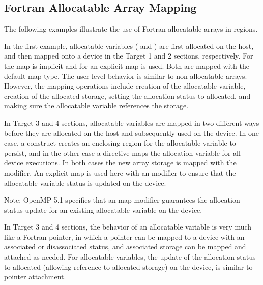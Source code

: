 \begin{fortranspecific}[4ex]
\section{Fortran Allocatable Array Mapping}
\label{sec:fort_allocatable_array_mapping}


The following examples illustrate the use of Fortran allocatable arrays in  regions.

In the first example, allocatable variables ( and ) are first allocated
on the host, and then mapped onto a device in the Target 1 and 2 sections, respectively.
For  the map is implicit and for  an explicit map is used.
Both are mapped with the default  map type.
The user-level behavior is similar to non-allocatable arrays.
However, the mapping operations include creation of the allocatable variable,
creation of the allocated storage, setting the allocation status to allocated,
and making sure the allocatable variable references the storage.

In Target 3 and 4 sections, allocatable variables are mapped in two
different ways before they are allocated on the host and subsequently used on the device.
In one case, a  construct creates an enclosing region for
the allocatable variable to persist, and in the other case a
 directive maps the allocation variable for all device executions.
In both cases the new array storage is mapped  with the  modifier.
An explicit map is used here with an  modifier to ensure that the allocatable
variable status is updated on the device.

Note: OpenMP 5.1 specifies that an  map modifier guarantees the
allocation status update for an existing allocatable variable on the device.

In Target 3 and 4 sections, the behavior of an allocatable variable is very
much like a Fortran pointer, in which a pointer can be mapped to a device with an associated
or disassociated status, and associated storage can be mapped and attached as needed.
For allocatable variables, the update of the allocation status to allocated (allowing
reference to allocated storage) on the device, is similar to pointer attachment.


\end{fortranspecific}
